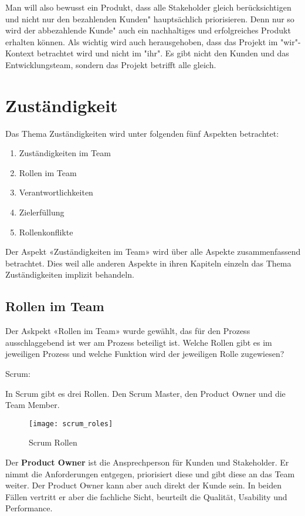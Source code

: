 Man will also bewusst ein Produkt, dass alle Stakeholder gleich berücksichtigen und nicht nur den bezahlenden Kunden" hauptsächlich priorisieren. Denn nur so wird der abbezahlende Kunde" auch ein nachhaltiges und erfolgreiches Produkt erhalten können.
\medskip
Als wichtig wird auch herausgehoben, dass das Projekt im "wir"-Kontext betrachtet wird und nicht im "ihr". Es gibt nicht den Kunden und das Entwicklungsteam, sondern das Projekt betrifft alle gleich.


\section{Zuständigkeit}

Das Thema Zuständigkeiten wird unter folgenden fünf Aspekten betrachtet:
\begin{enumerate}
\item Zuständigkeiten im Team
\item Rollen im Team
\item Verantwortlichkeiten
\item Zielerfüllung
\item Rollenkonflikte
\end{enumerate}

Der Aspekt «Zuständigkeiten im Team» wird über alle Aspekte zusammenfassend betrachtet. Dies weil alle anderen Aspekte in ihren Kapiteln einzeln das Thema Zuständigkeiten implizit behandeln.

\subsection{Rollen im Team}

Der Askpekt «Rollen im Team» wurde gewählt, das für den Prozess ausschlaggebend ist wer am Prozess beteiligt ist. Welche Rollen gibt es im jeweiligen Prozess und welche Funktion wird der jeweiligen Rolle zugewiesen?

{\Large Scrum:} \medskip

In Scrum gibt es drei Rollen. Den Scrum Master, den Product Owner und die Team Member. 
\begin{figure}[H]
	\centering
	\texttt{[image: scrum\_roles]}
	\caption{Scrum Rollen}
	\label{fig:scrumrollen}
\end{figure}

Der \textbf{Product Owner} ist die Ansprechperson für Kunden und Stakeholder. Er nimmt die Anforderungen entgegen, priorisiert diese und gibt diese an das Team weiter. Der Product Owner kann aber auch direkt der Kunde sein. In beiden Fällen vertritt er aber die fachliche Sicht, beurteilt die Qualität, Usability und Performance. \medskip

